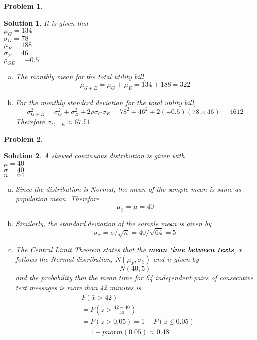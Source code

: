 \documentclass{article}
\newtheorem{problem}{Problem}
\newtheorem*{solution*}{Solution}
\begin{document}
\begin{problem}
\end{problem}
\begin{solution*}It is given that\\
  $\mu_G=134$\\
  $\sigma_G=78$\\
  $\mu_E=188$\\
  $\sigma_E=46$\\
  $\rho_{GE}=-0.5$
  \begin{enumerate}[(a)]
    \item The monthly mean for the total utility bill,
      $$\mu_{G+E}=\mu_G+\mu_E=134+188=322$$
    \item For the monthly standard deviation for the total utility bill,
      $$
        \sigma_{G+E}^2
        =\sigma_G^2+\sigma_E^2+2\rho\sigma_G\sigma_E
        =78^2+46^2+2(-0.5)(78\times 46)
        =4612
      $$
      Therefore $\sigma_{G+E}\approx{67.91}$
  \end{enumerate}
\end{solution*}

\begin{problem}
\end{problem}
\begin{solution*}A skewed continuous distribution is given with\\
  $\mu=40$\\
  $\sigma=40$\\
  $n=64$
  \begin{enumerate}[(a)]
    \item Since the distribution is Normal, the mean 
    of the sample mean is same as population mean. Therefore
      $$\mu_{\bar{x}}=\mu=40$$
    \item Similarly, the standard deviation of the sample mean 
    is given by
      $$\sigma_{\bar{x}}=\sigma/\sqrt{n}=40/\sqrt{64}=5$$
    \item The Central Limit Theorem states that the \textbf{mean time between texts},
    $\bar{x}$ follows the Normal distribution, $N(\mu_{\bar{x}}, \sigma_{\bar{x}})$ and is given by
      $$N(40,5)$$
      and the probability that the mean time for 64 independent pairs of consecutive text messages 
      is more than 42 minutes is
      \begin{align*}
        &P(\bar{x}>42)\\
        &=P(z>\frac{42-40}{40})\\
        &=P(z>0.05) = 1-P(z\le{0.05})\\
        &=1-pnorm(0.05)\approx\boxed{0.48}
      \end{align*}
  \end{enumerate}
\end{solution*}
\end{document}
